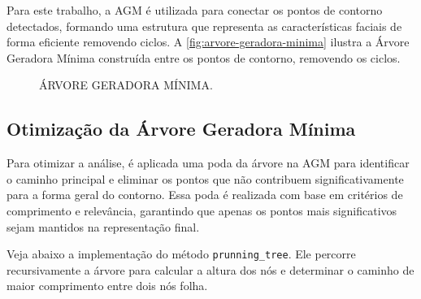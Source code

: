 Para este trabalho, a AGM é utilizada para conectar os pontos de contorno detectados, formando uma estrutura que representa as características faciais de forma eficiente removendo ciclos. A \autoref{fig:arvore-geradora-minima} ilustra a Árvore Geradora Mínima construída entre os pontos de contorno, removendo os ciclos.

\begin{figure}
    \caption{ÁRVORE GERADORA MÍNIMA.}
    \label{fig:arvore-geradora-minima}
    \centering
\end{figure}

\subsection{Otimização da Árvore Geradora Mínima}

Para otimizar a análise, é aplicada uma poda da árvore na AGM para identificar o caminho principal e eliminar os pontos que não contribuem significativamente para a forma geral do contorno. Essa poda é realizada com base em critérios de comprimento e relevância, garantindo que apenas os pontos mais significativos sejam mantidos na representação final.


Veja abaixo a implementação do método \texttt{prunning\_tree}. Ele percorre recursivamente a árvore para calcular a altura dos nós e determinar o caminho de maior comprimento entre dois nós folha.

